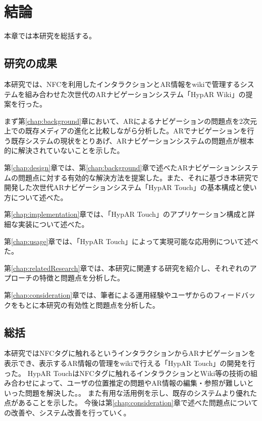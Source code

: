 \chapter{結論}
\label{chap:conclusion}

本章では本研究を総括する。

\newpage



\section{研究の成果}
本研究では、NFCを利用したインタラクションとAR情報をwikiで管理するシステムを組み合わせた次世代のARナビゲーションシステム「HypAR Wiki」の提案を行った。

まず第\ref{chap:background}章において、ARによるナビゲーションの問題点を2次元上での既存メディアの進化と比較しながら分析した。ARでナビゲーションを行う既存システムの現状をとりあげ、ARナビゲーションシステムの問題点が根本的に解決されていないことを示した。

第\ref{chap:design}章では、第\ref{chap:background}章で述べたARナビゲーションシステムの問題点に対する有効的な解決方法を提案した。また、それに基づき本研究で開発した次世代ARナビゲーションシステム「HypAR Touch」の基本構成と使い方について述べた。

第\ref{chap:implementation}章では、「HypAR Touch」のアプリケーション構成と詳細な実装について述べた。

第\ref{chap:usage}章では、「HypAR Touch」によって実現可能な応用例について述べた。

第\ref{chap:relatedResearch}章では、本研究に関連する研究を紹介し、それぞれのアプローチの特徴と問題点を分析した。

第\ref{chap:consideration}章では、筆者による運用経験やユーザからのフィードバックをもとに本研究の有効性と問題点を分析した。

\section{総括}
本研究ではNFCタグに触れるというインタラクションからARナビゲーションを表示でき、表示するAR情報の管理をwikiで行える「HypAR Touch」の開発を行った。
HypAR TouchはNFCタグに触れるインタラクションとWiki等の技術の組み合わせによって、ユーザの位置推定の問題やAR情報の編集・参照が難しいといった問題を解決した。。
また有用な活用例を示し、既存のシステムより優れた点があることを示した。
今後は第\ref{chap:consideration}章で述べた問題点についての改善や、システム改善を行っていく。